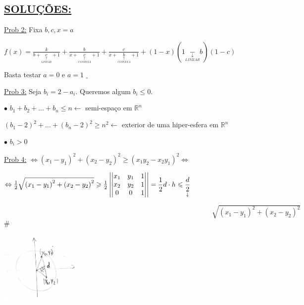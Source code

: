\documentclass[a4paper,12pt]{article}
\renewcommand{\leq}{\ensuremath{\leqslant}}
\renewcommand{\geq}{\ensuremath{\geqslant}}
\theoremstyle{plain} %
\theoremstyle{definition} %
\theoremstyle{remark} %
\begin{document}
	\begin{framed}
		
		\begin{center}
			\section*{\underline{SOLU\c{C}\~OES:}}
		\end{center}
		
		\vspace{2ex}\underline{Prob 2:} Fixa $b, c, x=a$
		
		\begin{center}
			$\displaystyle f(x)=\frac{k}{b+\underset{\underset{LINEAR}{\uparrow}}{c}+1}+\frac{b}{x+\underset{\underset{CONVEXA}{\uparrow}}{c}+1}+\frac{c}{x+\underset{\underset{CONVEXA}{\uparrow}}{b}+1}+(1-x)(1\underset{\underset{LINEAR}{\downarrow}}{-}b)(1-c)$
		\end{center}
		
		Basta testar $a=0$ e $a=1$ $_\square$
		
		\vspace{2ex}\underline{Prob 3:} Seja $b_i=2-a_i$. Queremos algum $b_i\leq 0$.
		
		$\bullet$ \hspace{1em} $b_1+b_2+\dotso+b_n\leq n\leftarrow$ semi-espa\c{c}o em $\mathds{R}^n$
		
		$(b_1-2)^2+\dotso+(b_n-2)^2\geq n^2\leftarrow$ exterior de uma hiper-esfera em $\mathds{R}^n$
		
		$\bullet$ \hspace{1em} $b_i>0$
		
		\vspace{2ex}\underline{Prob 4:} $\Leftrightarrow (x_1-y_1)^2+(x_2-y_2)^2\geq(x_1y_2-x_2y_1)^2\Leftrightarrow$
		
		$\Leftrightarrow \frac{1}{2} \sqrt{\left(x_{1}-y_{1}\right)^{2}+\left(x_{2}-y_{2}\right)^{2}} \geqslant \frac{1}{2}\left|\left|\begin{matrix}x_{1} & y_{1} & 1 \\ x_{2} & y_{2} & 1 \\ 0 & 0 & 1\end{matrix}\right|\right| = \displaystyle\frac{1}{2} d \cdot h \leq \underset{\huge\downarrow\normalsize}{\displaystyle\frac{d}{2}}$
		
		\scriptsize$\hspace{30em}\sqrt{\left(x_{1}-y_{1}\right)^{2}+\left(x_{2}-y_{2}\right)^{2}}$ \huge\#
		
		\normalsize
		
		\includegraphics[width=0.3\textwidth]{2 page 18.png}
	\end{framed}
	
\end{document}

